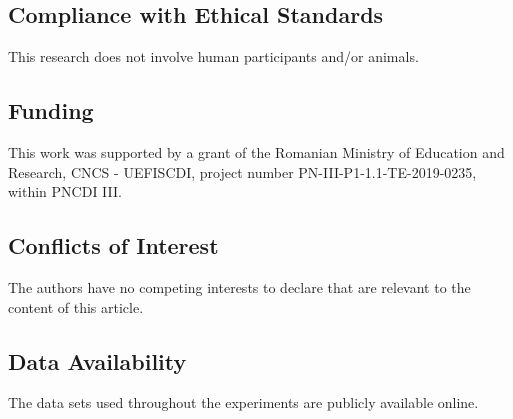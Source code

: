 \documentclass[pdflatex,sn-mathphys]{sn-jnl}
\theoremstyle{thmstyleone}
\theoremstyle{thmstyletwo}\newtheorem{example}{Example}\newtheorem{remark}{Remark}
\theoremstyle{thmstylethree}\newtheorem{definition}{Definition}\DeclareMathOperator{\sinc}{sinc}
\begin{document}
\subsection{Compliance with Ethical Standards}
This research does not involve human participants and/or animals.

\subsection{Funding}
This work was supported by a grant of the Romanian Ministry of Education and Research, CNCS - UEFISCDI, project number PN-III-P1-1.1-TE-2019-0235, within PNCDI III.

\subsection{Conflicts of Interest}
The authors have no competing interests to declare that are relevant to the content of this article.

\subsection{Data Availability}

The data sets used throughout the experiments are publicly available online.






\end{document}
